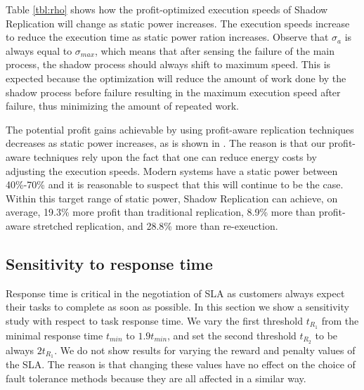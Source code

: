 Table \ref{tbl:rho} shows how the profit-optimized execution speeds
of Shadow Replication will change as static power increases. The execution speeds increase to reduce the execution time as static power ration increases. Observe
that $\sigma_a$ is always equal to $\sigma_{max}$, which means that after
sensing the failure of the main process, the shadow process should always
shift to maximum speed. This is expected because the optimization will
reduce the amount of work done by the shadow process before failure
resulting in the maximum execution speed after failure, thus
minimizing the amount of repeated work. 

The potential profit gains achievable by using profit-aware
replication techniques decreases as static power increases, as is shown
in . The reason is that our profit-aware
techniques rely upon the fact that one can reduce energy costs by
adjusting the execution speeds. Modern systems have a static power between 40\%-70\% and
it is reasonable to suspect that this will continue to be the case. Within
this target range of static power, Shadow Replication can achieve, on
average, 19.3\% more profit than traditional replication, 8.9\% more
than profit-aware stretched replication, and 28.8\% more than re-exeuction.


\subsection{Sensitivity to response time}

Response time is critical in the negotiation of SLA as customers
always expect their tasks to complete as soon as possible. In this
section we show a sensitivity study with respect to task response
time. We vary the first threshold $t_{R_1}$ from the minimal response
time $t_{min}$ to $1.9t_{min}$, and set the second threshold $t_{R_2}$
to be always $2t_{R_1}$. We do not show results for varying the reward
and penalty values of the SLA. The reason is that changing these
values have no effect on the choice of fault tolerance methods because
they are all affected in a similar way.

